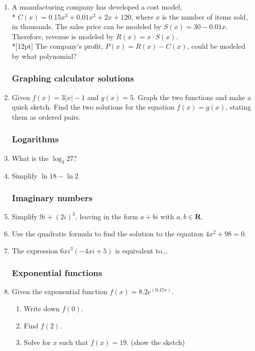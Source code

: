 \documentclass[12pt, twoside]{article}
\begin{document}
\begin{enumerate}
\newpage
  \item A manufacturing company has developed a cost model,\\* $C(x)=0.15x^3 +0.01x^2+2x+120$, where $x$ is the number of items sold, in thousands. The sales price can be modeled by $S(x)=30-0.01x$. Therefore, revenue is modeled by $R(x)=x \cdot S(x)$.\\*[12pt]
  The company’s profit, $P(x)=R(x)-C(x)$, could be modeled by what polynomial?
   \vspace{4.5cm}

\subsubsection*{Graphing calculator solutions}
  \item Given $f(x) = 3|x|-1$ and $g(x)=5$. Graph the two functions and make a quick sketch. Find the two solutions for the equation $f(x)=g(x)$, stating them as ordered pairs.  \vspace{4.5cm}

\subsubsection*{Logarithms}
  \item What is the $\log_3{27}$? \vspace{2.5cm}
  \item Simplify $\ln{18}-\ln{2}$ \vspace{2.5cm}

\newpage
\subsubsection*{Imaginary numbers}
  \item Simplify $9i+(2i)^3$, leaving in the form $a+bi$ with $a,b \in \mathbf{R}$. \vspace{2cm}
  \item Use the quadratic formula to find the solution to the equation $4x^2+98=0$. \vspace{4cm}
  \item The expression $6xi^3(-4xi + 5)$ is equivalent to... \vspace{3.5cm}

\subsubsection*{Exponential functions}

\item Given the exponential function $\displaystyle f(x)=8.2e^{(0.47x)}$.
  \begin{enumerate}
      \item Write down $f(0)$. \vspace{1.5cm}
      \item Find $f(2)$. \vspace{1.5cm}
      \item Solve for $x$ such that $f(x)=19$. (show the sketch) \vspace{2.5cm}
  \end{enumerate}

\end{enumerate}
\end{document}
